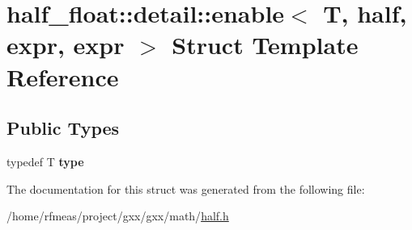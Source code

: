 \hypertarget{structhalf__float_1_1detail_1_1enable_3_01T_00_01half_00_01expr_00_01expr_01_4}{}\section{half\+\_\+float\+:\+:detail\+:\+:enable$<$ T, half, expr, expr $>$ Struct Template Reference}
\label{structhalf__float_1_1detail_1_1enable_3_01T_00_01half_00_01expr_00_01expr_01_4}
\subsection*{Public Types}
\begin{DoxyCompactItemize}
\item 
typedef T {\bfseries type}\hypertarget{structhalf__float_1_1detail_1_1enable_3_01T_00_01half_00_01expr_00_01expr_01_4_a42da82c2195536cc977d291a06ba7de9}{}\label{structhalf__float_1_1detail_1_1enable_3_01T_00_01half_00_01expr_00_01expr_01_4_a42da82c2195536cc977d291a06ba7de9}

\end{DoxyCompactItemize}


The documentation for this struct was generated from the following file\+:\begin{DoxyCompactItemize}
\item 
/home/rfmeas/project/gxx/gxx/math/\hyperlink{half_8h}{half.\+h}\end{DoxyCompactItemize}

